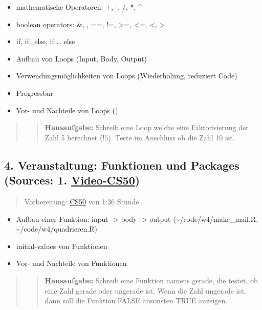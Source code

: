 \begin{itemize}
\tightlist
\item
  mathematische Operatoren: +, -, /, *, \^{}
\item
  boolean operators: \&, \textbar, ==, !=, \textgreater=, \textless=,
  \textless, \textgreater{}
\item
  if, if\_else, if \ldots{} else
\item
  Aufbau von Loops (Input, Body, Output)
\item
  Verwendungsmöglichkeiten von Loops (Wiederholung, reduziert Code)
\item
  Progressbar
\item
  Vor- und Nachteile von Loops ()
\end{itemize}

\begin{quote}
\begin{quote}
\textbf{Hausaufgabe:} Schreib eine Loop welche eine Faktorisierung der
Zahl 5 berechnet (\(!5\)). Teste im Anschluss ob die Zahl 10 ist.
\end{quote}
\end{quote}

\subsection{\texorpdfstring{4. Veranstaltung: Funktionen und Packages
(Sources: 1.
\href{https://www.youtube.com/watch?v=JP7ITIXGpHk&list=PLhQjrBD2T3817j24-GogXmWqO5Q5vYy0V&index=2}{Video-CS50})}{4. Veranstaltung: Funktionen und Packages (Sources: 1. Video-CS50)}}\label{veranstaltung-funktionen-und-packages-sources-1.-video-cs50}

\begin{quote}
Vorbereitung:
\href{https://www.youtube.com/watch?v=JP7ITIXGpHk&list=PLhQjrBD2T3817j24-GogXmWqO5Q5vYy0V&index=2}{CS50}
von 1:36 Stunde
\end{quote}

\begin{itemize}
\tightlist
\item
  Aufbau einer Funktion: input -\textgreater{} body -\textgreater{}
  output (\textasciitilde/code/w4/make\_mail.R,
  \textasciitilde/code/w4/quadrieren.R)
\item
  initial-values von Funktionen
\item
  Vor- und Nachteile von Funktionen
\end{itemize}

\begin{quote}
\begin{quote}
\textbf{Hausaufgabe:} Schreib eine Funktion namens gerade, die testet,
ob eine Zahl gerade oder ungerade ist. Wenn die Zahl ungerade ist, dann
soll die Funktion FALSE ansonsten TRUE anzeigen.
\end{quote}
\end{quote}

